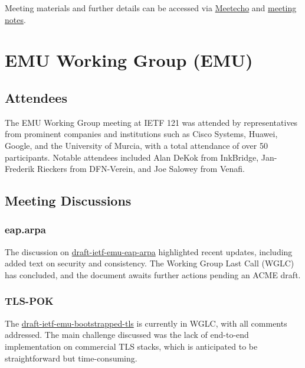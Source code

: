 \documentclass{article}
\begin{document}
Meeting materials and further details can be accessed via \href{https://meetings.conf.meetecho.com/ietf121/?group=emailcore&short=&item=1}{Meetecho} and \href{https://notes.ietf.org/notes-ietf-121-emailcore}{meeting notes}.



\newpage

\section{EMU Working Group (EMU)}

\subsection{Attendees}

The EMU Working Group meeting at IETF 121 was attended by representatives from prominent companies and institutions such as Cisco Systems, Huawei, Google, and the University of Murcia, with a total attendance of over 50 participants. Notable attendees included Alan DeKok from InkBridge, Jan-Frederik Rieckers from DFN-Verein, and Joe Salowey from Venafi.

\subsection{Meeting Discussions}

\subsubsection{eap.arpa}

The discussion on \href{https://datatracker.ietf.org/doc/html/draft-ietf-emu-eap-arpa}{draft-ietf-emu-eap-arpa} highlighted recent updates, including added text on security and consistency. The Working Group Last Call (WGLC) has concluded, and the document awaits further actions pending an ACME draft.

\subsubsection{TLS-POK}

The \href{https://datatracker.ietf.org/doc/html/draft-ietf-emu-bootstrapped-tls}{draft-ietf-emu-bootstrapped-tls} is currently in WGLC, with all comments addressed. The main challenge discussed was the lack of end-to-end implementation on commercial TLS stacks, which is anticipated to be straightforward but time-consuming.
\end{document}

